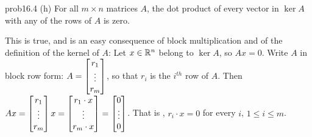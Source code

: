 \begin{sol}{prob16.4}
(h) For all $m\times n$ matrices $A$, the dot product of every vector in $\ker A$ with any of the rows of $A$ is zero.

\soln This is true, and is an easy consequence of block multiplication and of the definition of the kernel of $A$: Let $x\in \mathbb{R}^n$ belong to $\ker A$, so $Ax=0$. Write $A$ in block row form: $A=\bmatrix r_1\\\vdots\\ r_m\endbmatrix$, so that $r_i$ is the $i^{th}$ row of $A$. Then $Ax= \bmatrix r_1\\\vdots\\ r_m\endbmatrix x=\bmatrix r_1\cdot x \\ \vdots\\ r_m\cdot x\endbmatrix= \bmatrix 0\\\vdots\\ 0\endbmatrix$. That is , $r_i \cdot x =0$ for every $i$, $1\le i\le m$.


\end{sol}

